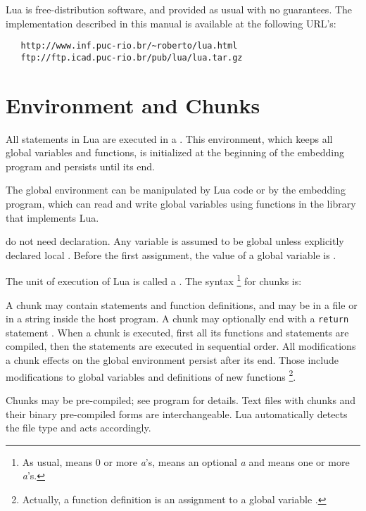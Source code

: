 Lua is free-distribution software,
and provided as usual with no guarantees.
The implementation described in this manual is available
at the following URL's:
\begin{verbatim}
   http://www.inf.puc-rio.br/~roberto/lua.html
   ftp://ftp.icad.puc-rio.br/pub/lua/lua.tar.gz
\end{verbatim}


\section{Environment and Chunks}

All statements in Lua are executed in a .
This environment, which keeps all global variables and functions,
is initialized at the beginning of the embedding program and
persists until its end.

The global environment can be manipulated by Lua code or
by the embedding program,
which can read and write global variables
using functions in the library that implements Lua.

 do not need declaration.
Any variable is assumed to be global unless explicitly declared local
.
Before the first assignment, the value of a global variable is \nil.

The unit of execution of Lua is called a .
The syntax%
\footnote{As usual,  means 0 or more {\em a\/}'s,
 means an optional {\em a} and  means
one or more {\em a\/}'s.}
for chunks is:
\begin{Produc}
\end{Produc}%
A chunk may contain statements and function definitions,
and may be in a file or in a string inside the host program.
A chunk may optionally end with a \verb|return| statement .
When a chunk is executed, first all its functions and statements are compiled,
then the statements are executed in sequential order.
All modifications a chunk effects on the global environment persist
after its end.
Those include modifications to global variables and definitions
of new functions%
\footnote{Actually, a function definition is an
assignment to a global variable .}.

Chunks may be pre-compiled; see program  for details.
Text files with chunks and their binary pre-compiled forms
are interchangeable.
Lua automatically detects the file type and acts accordingly.

